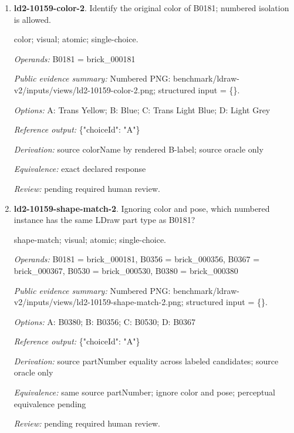 \begin{enumerate}
\par{\small distance; source-data; atomic; single-choice.\par\textit{Operands:} B0510 = brick\_000510, B0234 = brick\_000234, B0132 = brick\_000132, B0138 = brick\_000138\par\textit{Public evidence summary:} \{"coordinateFrame": "Viewer world, millimeters, Euclidean distance", "centers": \{"B0132": [124, 53.6, -224], "B0234": [93.534, 213.4228, -211.256], "B0138": [-116, 53.6, -224], "B0510": [255.005523, 23.458353, 71.775633]\}\}\par\textit{Options:} A: B0234; B: B0510; C: B0138\par\textit{Reference output:} \{"choiceId": "A"\}\par\textit{Derivation:} Euclidean norm from public rounded centers\par\textit{Equivalence:} exact declared response\par\textit{Review:} machine checks passed; no human certification.}
\item \textbf{ld2-10159-color-2}. Identify the original color of B0181; numbered isolation is allowed.
\par{\small color; visual; atomic; single-choice.\par\textit{Operands:} B0181 = brick\_000181\par\textit{Public evidence summary:} Numbered PNG: benchmark/ldraw-v2/inputs/views/ld2-10159-color-2.png; structured input = \{\}.\par\textit{Options:} A: Trans Yellow; B: Blue; C: Trans Light Blue; D: Light Grey\par\textit{Reference output:} \{"choiceId": "A"\}\par\textit{Derivation:} source colorName by rendered B-label; source oracle only\par\textit{Equivalence:} exact declared response\par\textit{Review:} pending required human review.}
\item \textbf{ld2-10159-shape-match-2}. Ignoring color and pose, which numbered instance has the same LDraw part type as B0181?
\par{\small shape-match; visual; atomic; single-choice.\par\textit{Operands:} B0181 = brick\_000181, B0356 = brick\_000356, B0367 = brick\_000367, B0530 = brick\_000530, B0380 = brick\_000380\par\textit{Public evidence summary:} Numbered PNG: benchmark/ldraw-v2/inputs/views/ld2-10159-shape-match-2.png; structured input = \{\}.\par\textit{Options:} A: B0380; B: B0356; C: B0530; D: B0367\par\textit{Reference output:} \{"choiceId": "A"\}\par\textit{Derivation:} source partNumber equality across labeled candidates; source oracle only\par\textit{Equivalence:} same source partNumber; ignore color and pose; perceptual equivalence pending\par\textit{Review:} pending required human review.}

\end{enumerate}
